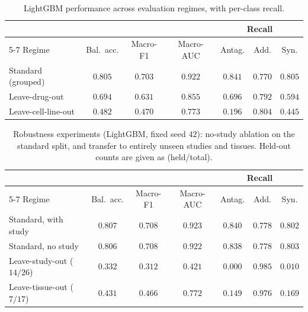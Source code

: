 \documentclass{bmcart}
\begin{document}
\begin{backmatter}
\begin{table}[h!]
\caption{LightGBM performance across evaluation regimes, with per-class recall.}
\label{tab:cold}
\begin{tabular}{lcccccc}
\toprule
 & & & & \multicolumn{3}{c}{Recall} \\
\cmidrule(lr){5-7}
Regime & Bal.\ acc. & Macro-F1 & Macro-AUC & Antag. & Add. & Syn. \\
\midrule
Standard (grouped) & $\mathbf{0.805}$ & $\mathbf{0.703}$ & $\mathbf{0.922}$ & $0.841$ & $0.770$ & $0.805$ \\
Leave-drug-out     & $0.694$ & $0.631$ & $0.855$ & $0.696$ & $0.792$ & $0.594$ \\
Leave-cell-line-out& $0.482$ & $0.470$ & $0.773$ & $0.196$ & $0.804$ & $0.445$ \\
\bottomrule
\end{tabular}
\end{table}

\begin{table}[h!]
\caption{Robustness experiments (LightGBM, fixed seed $42$): no-study ablation on the standard split,
and transfer to entirely unseen studies and tissues. Held-out counts are given as (held/total).}
\label{tab:robust}
\begin{tabular}{lcccccc}
\toprule
 & & & & \multicolumn{3}{c}{Recall} \\
\cmidrule(lr){5-7}
Regime & Bal.\ acc. & Macro-F1 & Macro-AUC & Antag. & Add. & Syn. \\
\midrule
Standard, with study      & $0.807$ & $0.708$ & $0.923$ & $0.840$ & $0.778$ & $0.802$ \\
Standard, no study        & $0.806$ & $0.708$ & $0.922$ & $0.838$ & $0.778$ & $0.803$ \\
Leave-study-out ($14/26$) & $0.332$ & $0.312$ & $0.421$ & $0.000$ & $0.985$ & $0.010$ \\
Leave-tissue-out ($7/17$) & $0.431$ & $0.466$ & $0.772$ & $0.149$ & $0.976$ & $0.169$ \\
\bottomrule
\end{tabular}
\end{table}


\end{backmatter}
\end{document}
